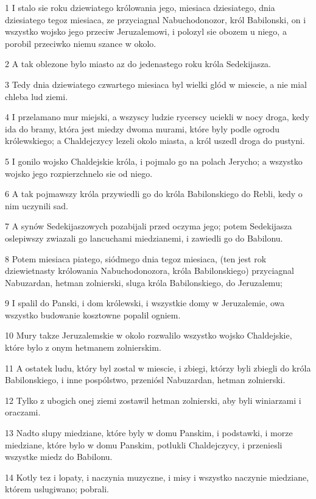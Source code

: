 \par 1 I stalo sie roku dziewiatego królowania jego, miesiaca dziesiatego, dnia dziesiatego tegoz miesiaca, ze przyciagnal Nabuchodonozor, król Babilonski, on i wszystko wojsko jego przeciw Jeruzalemowi, i polozyl sie obozem u niego, a porobil przeciwko niemu szance w okolo.
\par 2 A tak oblezone bylo miasto az do jedenastego roku króla Sedekijasza.
\par 3 Tedy dnia dziewiatego czwartego miesiaca byl wielki glód w miescie, a nie mial chleba lud ziemi.
\par 4 I przelamano mur miejski, a wszyscy ludzie rycerscy uciekli w nocy droga, kedy ida do bramy, która jest miedzy dwoma murami, które byly podle ogrodu królewskiego; a Chaldejczycy lezeli okolo miasta, a król uszedl droga do pustyni.
\par 5 I gonilo wojsko Chaldejskie króla, i pojmalo go na polach Jerycho; a wszystko wojsko jego rozpierzchnelo sie od niego.
\par 6 A tak pojmawszy króla przywiedli go do króla Babilonskiego do Rebli, kedy o nim uczynili sad.
\par 7 A synów Sedekijaszowych pozabijali przed oczyma jego; potem Sedekijasza oslepiwszy zwiazali go lancuchami miedzianemi, i zawiedli go do Babilonu.
\par 8 Potem miesiaca piatego, siódmego dnia tegoz miesiaca, (ten jest rok dziewietnasty królowania Nabuchodonozora, króla Babilonskiego) przyciagnal Nabuzardan, hetman zolnierski, sluga króla Babilonskiego, do Jeruzalemu;
\par 9 I spalil do Panski, i dom królewski, i wszystkie domy w Jeruzalemie, owa wszystko budowanie kosztowne popalil ogniem.
\par 10 Mury takze Jeruzalemskie w okolo rozwalilo wszystko wojsko Chaldejskie, które bylo z onym hetmanem zolnierskim.
\par 11 A ostatek ludu, który byl zostal w miescie, i zbiegi, którzy byli zbiegli do króla Babilonskiego, i inne pospólstwo, przeniósl Nabuzardan, hetman zolnierski.
\par 12 Tylko z ubogich onej ziemi zostawil hetman zolnierski, aby byli winiarzami i oraczami.
\par 13 Nadto slupy miedziane, które byly w domu Panskim, i podstawki, i morze miedziane, które bylo w domu Panskim, potlukli Chaldejczycy, i przeniesli wszystke miedz do Babilonu.
\par 14 Kotly tez i lopaty, i naczynia muzyczne, i misy i wszystko naczynie miedziane, którem uslugiwano; pobrali.
